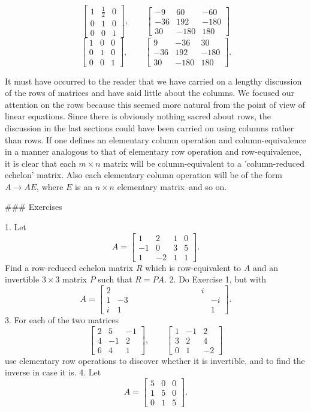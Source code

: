 \[\begin{bmatrix}1&\frac{1}{2}&0\\ 0&1&0\\ 0&0&1\end{bmatrix},\quad\quad\begin{bmatrix}-9&60&-60\\ -36&192&-180\\ 30&-180&180\end{bmatrix}\] \[\begin{bmatrix}1&0&0\\ 0&1&0\\ 0&0&1\end{bmatrix},\quad\quad\begin{bmatrix}9&-36&30\\ -36&192&-180\\ 30&-180&180\end{bmatrix}.\]

It must have occurred to the reader that we have carried on a lengthy discussion of the rows of matrices and have said little about the columns. We focused our attention on the rows because this seemed more natural from the point of view of linear equations. Since there is obviously nothing sacred about rows, the discussion in the last sections could have been carried on using columns rather than rows. If one defines an elementary column operation and column-equivalence in a manner analogous to that of elementary row operation and row-equivalence, it is clear that each \(m\times n\) matrix will be column-equivalent to a 'column-reduced echelon' matrix. Also each elementary column operation will be of the form \(A\to AE\), where \(E\) is an \(n\times n\) elementary matrix--and so on.

### Exercises

1. Let \[A=\begin{bmatrix}1&2&1&0\\ -1&0&3&5\\ 1&-2&1&1\end{bmatrix}.\] Find a row-reduced echelon matrix \(R\) which is row-equivalent to \(A\) and an invertible \(3\times 3\) matrix \(P\) such that \(R=PA\).
2. Do Exercise 1, but with \[A=\begin{bmatrix}2&\quad\quad\quad\quad\quad\quad\quad\quad\quad\quad i\\ 1&-3&-i\\ i&1&1\end{bmatrix}.\]
3. For each of the two matrices \[\begin{bmatrix}2&5&-1\\ 4&-1&2\\ 6&4&1\end{bmatrix},\quad\quad\begin{bmatrix}1&-1&2\\ 3&2&4\\ 0&1&-2\end{bmatrix}\] use elementary row operations to discover whether it is invertible, and to find the inverse in case it is.
4. Let \[A=\begin{bmatrix}5&0&0\\ 1&5&0\\ 0&1&5\end{bmatrix}.\] 